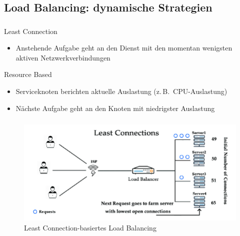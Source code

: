 \subsection{Load Balancing: dynamische Strategien}
\begin{frame}
    \frametitle{\insertsection}
    \framesubtitle{\insertsubsection}
    \begin{block}{Least Connection}
        \begin{itemize}
            \item Anstehende Aufgabe geht an den Dienst mit den momentan wenigsten aktiven Netzwerkverbindungen
        \end{itemize}
    \end{block}
    \begin{block}{Resource Based}
        \begin{itemize}
            \item Serviceknoten berichten aktuelle Auslastung (z.\,B.\ CPU-Auslastung)
            \item Nächste Aufgabe geht an den Knoten mit niedrigster Auslastung
        \end{itemize}
    \end{block}
\end{frame}

\begin{frame}
    \frametitle{\insertsection}
    \framesubtitle{\insertsubsection}

	\vspace{-12pt} %
    \begin{figure}[h]
        \centering
        \includegraphics[height=0.6\textheight]{../images/leastconnection}
        \caption{Least Connection-basiertes Load Balancing~\cite{efficient-load-balancing}}
    \end{figure}
\end{frame}

